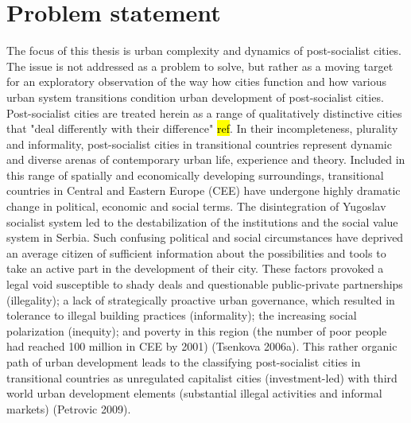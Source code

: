 \documentclass[11pt]{report}
\begin{document}
\section{Problem statement}
The focus of this thesis is urban complexity and dynamics of post-socialist cities. The issue is not addressed as a problem to solve, but rather as a moving target for an exploratory observation of the way how cities function and how various urban system transitions condition urban development of post-socialist cities.
\\
Post-socialist cities are treated herein as a range of qualitatively distinctive cities that "deal differently with their difference" \hl{ref}. In their incompleteness, plurality and informality, post-socialist cities in transitional countries represent dynamic and diverse arenas of contemporary urban life, experience and theory. Included in this range of spatially and economically developing surroundings, transitional countries in Central and Eastern Europe (CEE) have undergone highly dramatic change in political, economic and social terms. The disintegration of Yugoslav socialist system led to the destabilization of the institutions and the social value system in Serbia. Such confusing political and social circumstances have deprived an average citizen of sufficient information about the possibilities and tools to take an active part in the development of their city. These factors provoked a legal void susceptible to shady deals and questionable public-private partnerships (illegality); a lack of strategically proactive urban governance, which resulted in tolerance to illegal building practices (informality); the increasing social polarization (inequity); and poverty in this region (the number of poor people had reached 100 million in CEE by 2001) (Tsenkova 2006a). This rather organic path of urban development leads to the classifying post-socialist cities in transitional countries as unregulated capitalist cities (investment-led) with third world urban development elements (substantial illegal activities and informal markets) (Petrovic 2009).
\\
\end{document}
